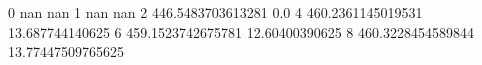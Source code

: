 0 nan nan
1 nan nan
2 446.5483703613281 0.0
4 460.2361145019531 13.687744140625
6 459.1523742675781 12.60400390625
8 460.3228454589844 13.77447509765625
